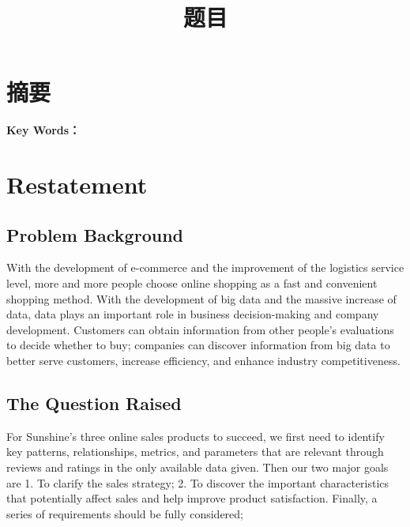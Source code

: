 \documentclass[UTF8]{article}
\title{题目}
\date{}
\begin{document}
\section*{摘\quad 要}
\begin{flushleft}

		
		
\textbf{Key Words：} {}
\newpage
\end{flushleft}

\section{Restatement}
\subsection{Problem Background}

With the development of e-commerce and the improvement of the logistics service level, more and more people choose online shopping as a fast and convenient shopping method. With the development of big data and the massive increase of data, data plays an important role in business decision-making and company development. Customers can obtain information from other people's evaluations to decide whether to buy; companies can discover information from big data to better serve customers, increase efficiency, and enhance industry competitiveness.

\subsection{The Question Raised}

For Sunshine's three online sales products to succeed, we first need to identify key patterns, relationships, metrics, and parameters that are relevant through reviews and ratings in the only available data given. Then our two major goals are 1. To clarify the sales strategy; 2. To discover the important characteristics that potentially affect sales and help improve product satisfaction. Finally, a series of requirements should be fully considered;
\end{document}
